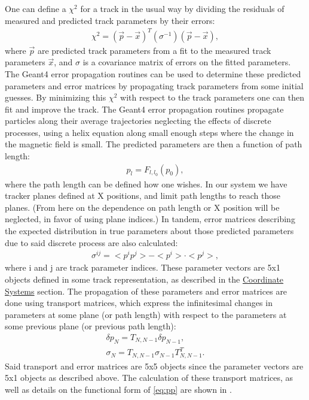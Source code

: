     One can define a $\chi^{2}$ for a track in the usual way by dividing the residuals of measured and predicted track parameters by their errors:
        \begin{align} \label{eq:chi2}
            \chi^2 = (\vec{p}-\vec{x})^{T} (\sigma^{-1}) (\vec{p}-\vec{x}),
        \end{align}
    where $\vec{p}$ are predicted track parameters from a fit to the measured track parameters $\vec{x}$, and $\sigma$ is a covariance matrix of errors on the fitted parameters. The Geant4 error propagation routines can be used to determine these predicted parameters and error matrices by propagating track parameters from some initial guesses. By minimizing this $\chi^{2}$ with respect to the track parameters one can then fit and improve the track. The Geant4 error propagation routines propagate particles along their average trajectories neglecting the effects of discrete processes, using a helix equation along small enough steps where the change in the magnetic field is small. The predicted parameters are then a function of path length: 
        \begin{align} \label{eq:pp}
            p_{l} = F_{l,l_{0}}(p_{0}),
        \end{align}
    where the path length can be defined how one wishes. In our system we have tracker planes defined at X positions, and limit path lengths to reach those planes. (From here on the dependence on path length or X position will be neglected, in favor of using plane indices.) In tandem, error matrices describing the expected distribution in true parameters about those predicted parameters due to said discrete process are also calculated:
        \begin{align} \label{eq:sigma}
            \sigma^{ij} = <p^{i}p^{j}> - <p^{i}> \cdot <p^{j}>,
        \end{align} 
    where i and j are track parameter indices. These parameter vectors are 5x1 objects defined in some track representation, as described in the \hyperref[sec:Coord]{Coordinate Systems} section. The propagation of these parameters and error matrices are done using transport matrices, which express the infinitesimal changes in parameters at some plane (or path length) with respect to the parameters at some previous plane (or previous path length):
        \begin{align} \label{eq:transport}
            \delta p_{N} = T_{N,N-1} \delta p_{N-1}, \\
            \sigma_{N} = T_{N,N-1} \sigma_{N-1} T_{N,N-1}^{T}.
        \end{align}
    Said transport and error matrices are 5x5 objects since the parameter vectors are 5x1 objects as described above. The calculation of these transport matrices, as well as details on the functional form of \ref{eq:pp} are shown in \cite{jacob}.

